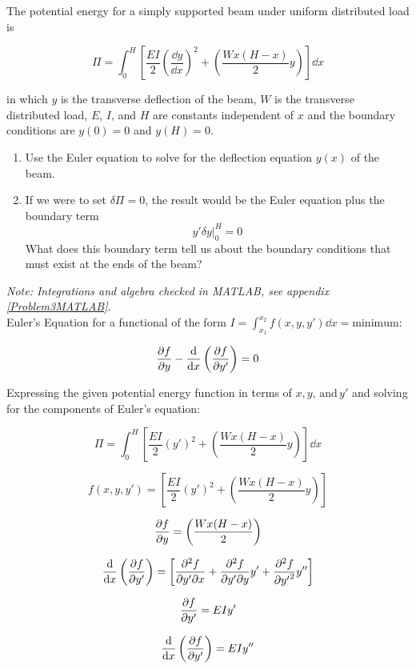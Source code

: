 \documentclass[../main.tex]{subfiles}
\begin{document}

The potential energy for a simply supported beam under uniform distributed load is

\[
    \Pi = \int_0^H \left[{\frac{EI}{2}\left({\frac{\dd y}{\dd x}}\right)^2 + \left({\frac{Wx(H-x)}{2}y}\right)}\right] \dd x
\]

in which \(y\) is the transverse deflection of the beam, \(W\) is the transverse distributed load, \(E\), \(I\), and \(H\) are constants independent of \(x\) %
and the boundary conditions are \(y(0) = 0\) and \(y(H)=0\).

\begin{enumerate}[label=\alph*)]
    \item Use the Euler equation to solve for the deflection equation \(y(x)\) of the beam.
    \item If we were to set \(\delta \Pi = 0\), the result would be the Euler equation plus the boundary term 
    \[
        \left.{y'\delta y}\right|_0^H = 0
    \]
    What does this boundary term tell us about the boundary conditions that must exist at the ends of the beam?
\end{enumerate}


\solution{}

\textit{Note: Integrations and algebra checked in MATLAB, see appendix \ref{Problem3MATLAB}}.\\

Euler's Equation for a functional of the form \(I = \int_{x_1}^{x_2} f(x,y,y')\dd x = \textrm{minimum}\):

\[
    \pdv{f}{y} - \dv{x}\left({\pdv{f}{y'}}\right) = 0
\]

Expressing the given potential energy function in terms of \(x, y, \,\textrm{and}\,y'\) and solving for the components of Euler's equation:

\[
    \Pi = \int_0^H \left[{\frac{EI}{2}\left({y'}\right)^2 + \left({\frac{Wx(H-x)}{2}y}\right)}\right] \dd x
\]

\[
    f(x,y,y') = \left[{\frac{EI}{2}\left({y'}\right)^2 + \left({\frac{Wx(H-x)}{2}y}\right)}\right]
\]

\[
    \pdv{f}{y} = \left({\frac{Wx(H-x)}{2}}\right)
\]

\[
    \dv{x}\left({\pdv{f}{y'}}\right) = \left[{
    \pdv{f}{y'}{x} + \pdv{f}{y'}{y} y' + \pdv[2]{f}{{y'}} y''
    }\right]
\]

\[
    \pdv{f}{y'} = EIy'
\]

\[
    \dv{x}\left({\pdv{f}{y'}}\right) = %
    EIy''
\]
\end{document}
